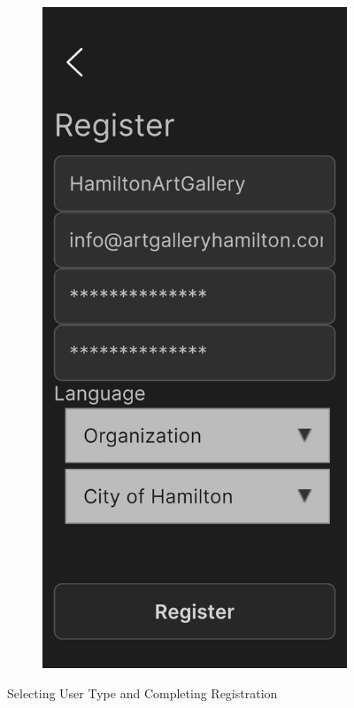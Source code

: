 \documentclass[12pt, titlepage]{article}
\begin{document}
\begin{figure}[ht!]
\begin{subfigure}[b]{0.48\textwidth}
    \end{subfigure}
    \hfill
    \begin{subfigure}[b]{0.48\textwidth}
        \centering
        \includegraphics[width=\textwidth]{register5.png}
    \end{subfigure}
    \caption{Selecting User Type and Completing Registration}
    \label{fig:setup3}
\end{figure}
\end{document}
